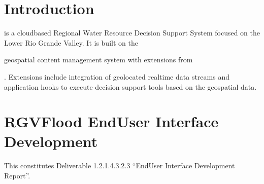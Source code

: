 \documentclass[letterpaper,12pt,english,openany,oneside]{sphinxmanual}
\begin{document}
\chapter{Introduction}
\label{\detokenize{introduction/index:introduction}}\label{\detokenize{introduction/index::doc}}
\sphinxAtStartPar
{\hyperref[\detokenize{_static/glossary:term-RGVFlood}]{}} is a cloud\sphinxhyphen{}based Regional Water Resource Decision Support System focused on the Lower Rio Grande Valley. It is built on the %
\begin{footnote}[1]\sphinxAtStartFootnote
{}
%
\end{footnote} geospatial content management system with extensions from %
\begin{footnote}[2]\sphinxAtStartFootnote
{}
%
\end{footnote}. {\hyperref[\detokenize{_static/glossary:term-REON}]{}} Extensions  include integration of geolocated real\sphinxhyphen{}time data streams and application hooks to execute decision support tools based on the geospatial data.

\sphinxstepscope


\chapter{RGVFlood End\sphinxhyphen{}User Interface Development}
\label{\detokenize{euidev/index:rgvflood-end-user-interface-development}}\label{\detokenize{euidev/index::doc}}
\sphinxAtStartPar
This constitutes Deliverable 1.2.1.4.3.2.3 “End\sphinxhyphen{}User Interface Development Report”.

\sphinxstepscope
\end{document}
